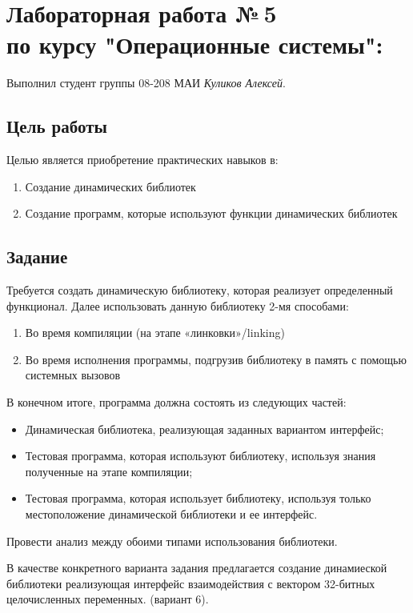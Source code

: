 \documentclass[12pt]{article}
\begin{document}
\section*{Лабораторная работа №\,5 \\ по курсу "Операционные системы": }

Выполнил студент группы 08-208 МАИ \textit{Куликов Алексей}.

\subsection*{Цель работы}
Целью является приобретение практических навыков в:
\begin{enumerate}
\item Создание динамических библиотек
\item Создание программ, которые используют функции динамических библиотек
\end{enumerate}

\subsection*{Задание}
Требуется создать динамическую библиотеку, которая реализует определенный функционал. Далее использовать данную библиотеку 2-мя способами:
\begin{enumerate}
    \item Во время компиляции (на этапе «линковки»/linking)
    \item Во время исполнения программы, подгрузив библиотеку в память с помощью системных вызовов
\end{enumerate}
В конечном итоге, программа должна состоять из следующих частей:
\begin{itemize}
    \item Динамическая библиотека, реализующая заданных вариантом интерфейс;
    \item Тестовая программа, которая используют библиотеку, используя знания полученные на этапе компиляции;
    \item Тестовая программа, которая использует библиотеку, используя только местоположение динамической библиотеки и ее интерфейс.
\end{itemize}
Провести анализ между обоими типами использования библиотеки.

В качестве конкретного варианта задания предлагается создание динамиеской библиотеки реализующая интерфейс взаимодействия с вектором 32-битных целочисленных переменных. (вариант 6).
\end{document}
